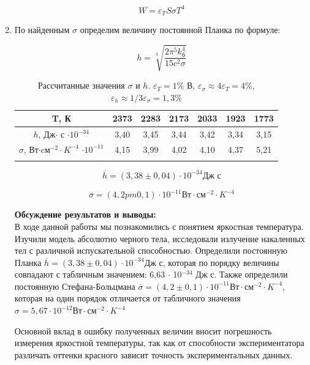 \documentclass[a4paper, 12pt]{article}%
\begin{document}
\begin{enumerate}
		$$ W = \varepsilon_T S \sigma T^4 $$
		
		\item По найденным $\sigma$ определим величину постоянной Планка по формуле: 
		
		$$ h = \sqrt[3]{\frac{2\pi^5k_{\text{б}}^4}{15c^2\sigma}} $$
		
		\begin{longtable}{|c|c|c|c|c|c|c|}
			\hline
			T, К & 2373 & 2283 & 2173 & 2033 & 1923 & 1773 \\\hline
			  $h$, Дж$\cdot$ с $\cdot 10^{-34}$& 3,40 & 3,45 & 3,44 & 3,42 & 3,34 & 3,15 \\ \hline
			$\sigma$, Вт$\cdot$cм$^{-2} \cdot K^{-4}$ $\cdot 10^{-11}$ & 4,15 & 3,99 & 4,02 & 4,10 & 4,37 & 5,21 \\ \hline
			\caption{Рассчитанные значения $\sigma$ и $h$.  $\varepsilon_T = 1\%$ В, $\varepsilon_{\sigma} \approx 4\varepsilon_T = 4\%$, $\varepsilon_{h} \approx 1/3\varepsilon_{\sigma} = 1,3\%$}
		\end{longtable}
		
		
		$$ \overline{h} = (3,38 \pm 0,04)\cdot 10^{-34} \text{Дж с}$$
		
		$$ \overline{\sigma} = (4,2 pm 0,1) \cdot 10^{-11} \text{Вт}\cdot \text{см}^{-2} \cdot K^{-4} $$
		
		
		\textbf{Обсуждение результатов и выводы: }\\
		
		В ходе данной работы мы познакомились с понятием яркостная температура. Изучили модель абсолютно черного тела, исследовали излучение накаленных тел с различной испускательной способностью. Определили постоянную Планка  $ \overline{h} = (3,38 \pm 0,04)\cdot 10^{-34} \text{Дж с}$, которая по порядку величины совпадают с табличным значением: 6,63 $\cdot$ 10$^{-34}$ Дж с. Также определили постоянную Стефана-Больцмана $ \overline{\sigma} = (4,2 \pm 0,1) \cdot 10^{-11} \text{Вт}\cdot \text{см}^{-2} \cdot K^{-4} $, которая на один порядок отличается от табличного значения $\sigma = 5,67\cdot 10^{-12} \text{Вт}\cdot \text{см}^{-2} \cdot K^{-4} $ 
		
		Основной вклад в ошибку полученных величин вносит погрешность измерения яркостной температуры, так как от способности экспериментатора различать оттенки красного зависит точность экспериментальных данных.
		
		
		
		
		
		
		
		
		
		
		
		
		
		
		
		
		
		
		
		
		
		
		
		
	\end{enumerate}
	
	
	
	
	
	
	
	
	
	
	
	
	
	
	
	
	
	
	
	
	
	
	
	
\end{document}
